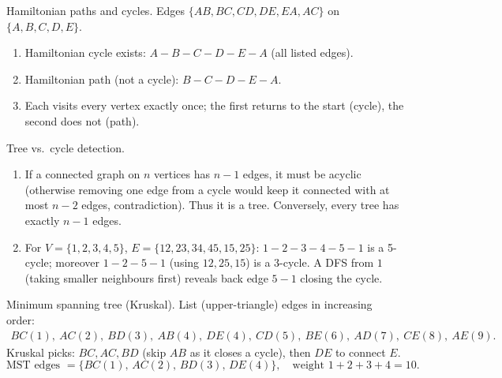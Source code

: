 \documentclass[11pt]{article}
\def\textbf#1{#1}%
\begin{document}
\begin{solution}
\textbf{Hamiltonian paths and cycles.}
Edges $\{AB,BC,CD,DE,EA,AC\}$ on $\{A,B,C,D,E\}$.
\begin{enumerate}
  \item \textbf{Hamiltonian cycle exists:} $A\!-\!B\!-\!C\!-\!D\!-\!E\!-\!A$ (all listed edges).
  \item \textbf{Hamiltonian path (not a cycle):} $B\!-\!C\!-\!D\!-\!E\!-\!A$.
  \item Each visits every vertex exactly once; the first returns to the start (cycle), the second does not (path).
\end{enumerate}
\end{solution}

\begin{solution}
\textbf{Tree vs.\ cycle detection.}
\begin{enumerate}
  \item If a connected graph on $n$ vertices has $n\!-\!1$ edges, it must be acyclic (otherwise removing one edge from a cycle would keep it connected with at most $n\!-\!2$ edges, contradiction). Thus it is a tree. Conversely, every tree has exactly $n\!-\!1$ edges.
  \item For $V=\{1,2,3,4,5\}$, $E=\{12,23,34,45,15,25\}$:
        $1\!-\!2\!-\!3\!-\!4\!-\!5\!-\!1$ is a 5-cycle; moreover $1\!-\!2\!-\!5\!-\!1$ (using $12,25,15$) is a 3-cycle.
        A DFS from $1$ (taking smaller neighbours first) reveals back edge $5\!-\!1$ closing the cycle.
\end{enumerate}

\begin{center}
\end{center}
\end{solution}

\begin{solution}
\textbf{Minimum spanning tree (Kruskal).}
List (upper-triangle) edges in increasing order:
\[
\begin{array}{l}
BC(1),\ AC(2),\ BD(3),\ AB(4),\ DE(4),\ CD(5),\ BE(6),\ AD(7),\ CE(8),\ AE(9).
\end{array}
\]
Kruskal picks: $BC, AC, BD$ (skip $AB$ as it closes a cycle), then $DE$ to connect $E$.
\[
\text{MST edges }=\{BC(1),\,AC(2),\,BD(3),\,DE(4)\},\quad \text{weight }1+2+3+4=10.
\]
\end{solution}
\end{document}

